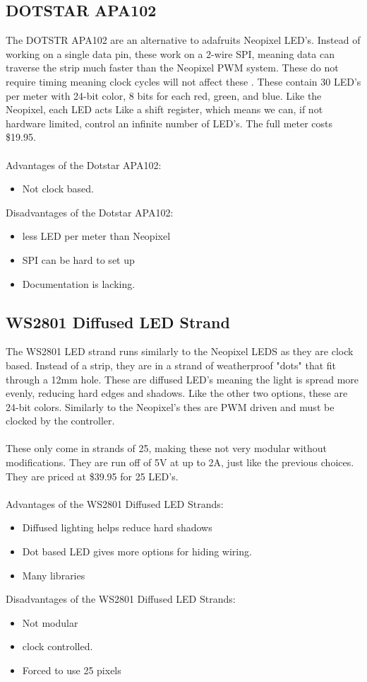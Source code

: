\documentclass[onecolumn, draftclsnofoot,10pt, compsoc]{IEEEtran}
\begin{document}
		\subsection{DOTSTAR APA102}
		The DOTSTR APA102 are an alternative to adafruits Neopixel LED's. Instead
		of working on a single data pin, these work on a 2-wire SPI, meaning data
		can traverse the strip much faster than the Neopixel PWM system. These do
		not require timing meaning clock cycles will not affect these
		\cite[Pg2]{dotstar}. These contain 30 LED's per meter with 24-bit color,
		8 bits for each red, green, and blue. Like the Neopixel, each LED acts Like
		a shift register, which means we can, if not hardware limited, control an
		infinite number of LED's. The full meter costs \$19.95.
		\\\\
		Advantages of the Dotstar APA102:
		\begin{itemize}
			\item Not clock based.
		\end{itemize}
		Disadvantages of the Dotstar APA102:
		\begin{itemize}
			\item less LED per meter than Neopixel
			\item SPI can be hard to set up
			\item Documentation is lacking.
		\end{itemize}
		\subsection{WS2801 Diffused LED Strand}
		The WS2801 LED strand runs similarly to the Neopixel LEDS as they are clock
		based. Instead of a strip, they are in a strand of weatherproof "dots"
		that fit through a 12mm hole\cite[Pg 2]{strand}. These are diffused LED's
		meaning the light is spread more evenly, reducing hard edges and shadows.
		Like the other two options, these are 24-bit colors. Similarly to the
		Neopixel's thes are PWM driven and must be clocked by the controller.
		\\\\
		These only come in strands of 25, making these not very modular without
		modifications. They are run off of 5V at up to 2A, just like the previous
		choices. They are priced at \$39.95 for 25 LED's.
		\\\\
		Advantages of the WS2801 Diffused LED Strands:
		\begin{itemize}
			\item Diffused lighting helps reduce hard shadows
			\item Dot based LED gives more options for hiding wiring.
			\item Many libraries
		\end{itemize}
		Disadvantages of the WS2801 Diffused LED Strands:
		\begin{itemize}
			\item Not modular
			\item clock controlled.
			\item Forced to use 25 pixels
		\end{itemize}
\end{document}

